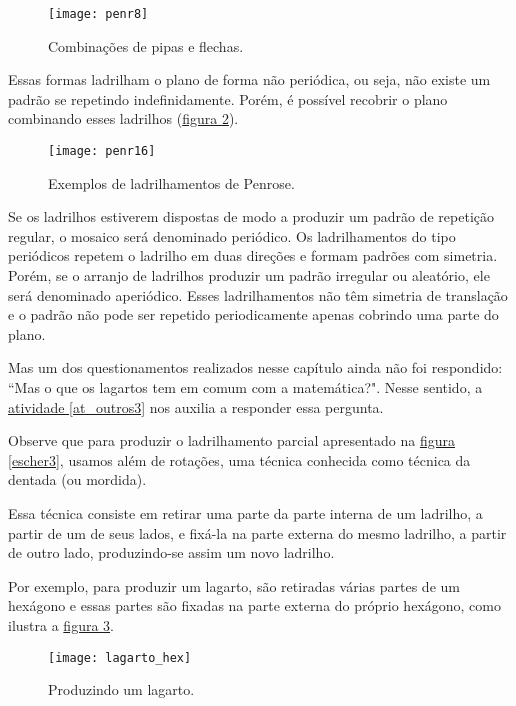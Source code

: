 { \begin{figure}[H]
	\centering
	\texttt{[image: penr8]}
	\caption{Combinações de pipas e flechas.}
	\label{penr_8}
\end{figure}



Essas formas  ladrilham o plano de forma não periódica, ou seja, não existe um padrão se repetindo indefinidamente. Porém, é possível recobrir o plano combinando esses ladrilhos (\hyperref[penr_16]{figura \ref{penr_16}}). 

 \begin{figure}[H]
	\centering
	\texttt{[image: penr16]}
	\caption{Exemplos de ladrilhamentos de Penrose.}
	\label{penr_16}
\end{figure}

Se os ladrilhos estiverem dispostas de modo a produzir um padrão de repetição regular, o mosaico será denominado periódico. Os ladrilhamentos do tipo periódicos repetem o ladrilho em duas direções e formam padrões com simetria. Porém, se o arranjo de ladrilhos produzir um padrão irregular ou aleatório, ele será denominado aperiódico. Esses ladrilhamentos não têm simetria de translação e o padrão não pode ser repetido periodicamente apenas cobrindo uma parte do plano.

Mas um dos questionamentos realizados nesse capítulo ainda não foi respondido: “Mas o que os lagartos tem em comum com a matemática?". Nesse sentido, a \hyperref[at_outros3]{atividade \ref{at_outros3}} nos auxilia a responder essa pergunta.

Observe que para produzir o ladrilhamento parcial apresentado na \hyperref[escher3]{figura \ref{escher3}}, usamos além de rotações, uma técnica conhecida como técnica da dentada (ou mordida).

Essa técnica consiste em retirar uma parte da parte interna de um ladrilho, a partir de um de seus lados, e fixá-la na parte externa do mesmo ladrilho, a partir de outro lado, produzindo-se assim um novo ladrilho.

Por exemplo, para produzir um lagarto, são retiradas várias partes de um hexágono e essas partes são fixadas na parte externa do próprio hexágono, como ilustra a \hyperref[lagarto_hex]{figura \ref{lagarto_hex}}.


 \begin{figure}[H]
	\centering
	\texttt{[image: lagarto\_hex]}
	\caption{Produzindo um lagarto.}
	\label{lagarto_hex}
\end{figure}

}

